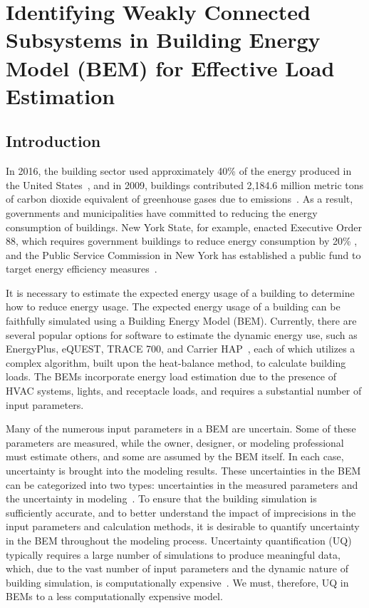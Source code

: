 \chapter{Identifying Weakly Connected Subsystems in Building Energy Model (BEM) for Effective Load Estimation}
\label{chap:building}

\section{Introduction}
In 2016, the building sector used approximately 40\% of the energy produced in the United States~\citep{useia2017}, and in 2009, buildings contributed 2,184.6 million metric tons of carbon dioxide equivalent of greenhouse gases due to emissions~\citep{useia2009}.  As a result, governments and municipalities have committed to reducing the energy consumption of buildings.  New York State, for example, enacted Executive Order 88, which requires government buildings to reduce energy consumption by 20\% \citep{statedirect}, and the Public Service Commission in New York has established a public fund to target energy efficiency measures~\citep{nyspublic}. 

It is necessary to estimate the expected energy usage of a building to determine how to reduce energy usage. The expected energy usage of a building can be faithfully simulated using a Building Energy Model (BEM). Currently, there are several popular options for software to estimate the dynamic energy use, such as EnergyPlus, eQUEST, TRACE 700, and Carrier HAP~\citep{Eplus,hirsch2006equest, trace, HAP}, each of which utilizes a complex algorithm, built upon the heat-balance method, to calculate building loads. The BEMs incorporate energy load estimation due to the presence of HVAC systems, lights, and receptacle loads, and requires a substantial number of input parameters.   

Many of the numerous input parameters in a BEM are uncertain.  Some of these parameters are measured, while the owner, designer, or modeling professional must estimate others, and some are assumed by the BEM itself.  In each case, uncertainty is brought into the modeling results.  These uncertainties in the BEM can be categorized into two types: uncertainties in the measured parameters and the uncertainty in modeling~\citep{ding2015uncertainty,sun2015quantification}. To ensure that the building simulation is sufficiently accurate, and to better understand the impact of imprecisions in the input parameters and calculation methods, it is desirable to quantify uncertainty in the BEM throughout the modeling process. Uncertainty quantification (UQ) typically requires a large number of simulations to produce meaningful data, which, due to the vast number of input parameters and the dynamic nature of building simulation, is computationally expensive~\citep{rysanek2013optimum,eisenhower2012uncertainty}. We must, therefore, UQ in BEMs to a less computationally expensive model.

